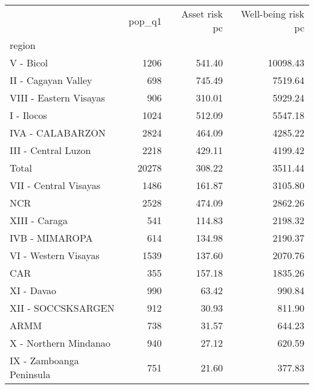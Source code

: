 \begin{tabular}{lrrr}
\toprule
{} &  pop\_q1 &  Asset risk pc &  Well-being risk pc \\
region                   &         &                &                     \\
\midrule
V - Bicol                &    1206 &         541.40 &            10098.43 \\
II - Cagayan Valley      &     698 &         745.49 &             7519.64 \\
VIII - Eastern Visayas   &     906 &         310.01 &             5929.24 \\
I - Ilocos               &    1024 &         512.09 &             5547.18 \\
IVA - CALABARZON         &    2824 &         464.09 &             4285.22 \\
III - Central Luzon      &    2218 &         429.11 &             4199.42 \\
Total                    &   20278 &         308.22 &             3511.44 \\
VII - Central Visayas    &    1486 &         161.87 &             3105.80 \\
NCR                      &    2528 &         474.09 &             2862.26 \\
XIII - Caraga            &     541 &         114.83 &             2198.32 \\
IVB - MIMAROPA           &     614 &         134.98 &             2190.37 \\
VI - Western Visayas     &    1539 &         137.60 &             2070.76 \\
CAR                      &     355 &         157.18 &             1835.26 \\
XI - Davao               &     990 &          63.42 &              990.84 \\
XII - SOCCSKSARGEN       &     912 &          30.93 &              811.90 \\
ARMM                     &     738 &          31.57 &              644.23 \\
X - Northern Mindanao    &     940 &          27.12 &              620.59 \\
IX - Zamboanga Peninsula &     751 &          21.60 &              377.83 \\
\bottomrule
\end{tabular}
